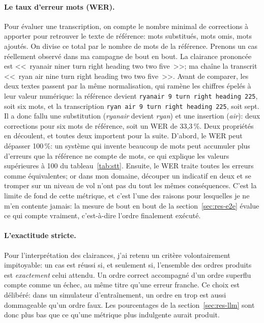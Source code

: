 \documentclass[11pt,a4paper]{article}
\begin{document}
\paragraph{Le taux d'erreur mots (WER).} Pour évaluer une transcription, on compte le nombre minimal de corrections à apporter pour retrouver le texte de référence: mots substitués, mots omis, mots ajoutés. On divise ce total par le nombre de mots de la référence. Prenons un cas réellement observé dans ma campagne de bout en bout. La clairance prononcée est <<~ryanair niner turn right heading two two five~>>; ma chaîne la transcrit <<~ryan air nine turn right heading two two five~>>. Avant de comparer, les deux textes passent par la même normalisation, qui ramène les chiffres épelés à leur valeur numérique: la référence devient \texttt{ryanair 9 turn right heading 225}, soit six mots, et la transcription \texttt{ryan air 9 turn right heading 225}, soit sept. Il a donc fallu une substitution (\emph{ryanair} devient \emph{ryan}) et une insertion (\emph{air}): deux corrections pour six mots de référence, soit un WER de 33,3\,\%. Deux propriétés en découlent, et toutes deux importent pour la suite. D'abord, le WER peut dépasser 100\,\%: un système qui invente beaucoup de mots peut accumuler plus d'erreurs que la référence ne compte de mots, ce qui explique les valeurs supérieures à 100 du tableau~\ref{tab:stt}. Ensuite, le WER traite toutes les erreurs comme équivalentes; or dans mon domaine, découper un indicatif en deux et se tromper sur un niveau de vol n'ont pas du tout les mêmes conséquences. C'est la limite de fond de cette métrique, et c'est l'une des raisons pour lesquelles je ne m'en contente jamais: la mesure de bout en bout de la section~\ref{sec:res-e2e} évalue ce qui compte vraiment, c'est-à-dire l'ordre finalement exécuté.

\paragraph{L'exactitude stricte.} Pour l'interprétation des clairances, j'ai retenu un critère volontairement impitoyable: un cas est réussi si, et seulement si, l'ensemble des ordres produits est \emph{exactement} celui attendu. Un ordre correct accompagné d'un ordre superflu compte comme un échec, au même titre qu'une erreur franche. Ce choix est délibéré: dans un simulateur d'entraînement, un ordre en trop est aussi dommageable qu'un ordre faux. Les pourcentages de la section~\ref{sec:res-llm} sont donc plus bas que ce qu'une métrique plus indulgente aurait produit.
\end{document}
